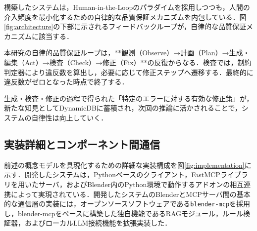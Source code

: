 \documentclass[dvipdfmx, a4paper, 9pt]{deimj}
\begin{document}
構築したシステムは，Human-in-the-Loopのパラダイムを採用しつつも，人間の介入頻度を最小化するための自律的な品質保証メカニズムを内包している．図\ref{fig:architecture}の下部に示されるフィードバックループが，自律的な品質保証メカニズムに該当する．

本研究の自律的品質保証ループは，**観測（Observe）→計画（Plan）→生成・編集（Act）→検査（Check）→修正（Fix）**の反復からなる．検査では，制約判定器により違反数を算出し，必要に応じて修正ステップへ遷移する．最終的に違反数がゼロとなった時点で終了する．

生成・検査・修正の過程で得られた「特定のエラーに対する有効な修正策」が，新たな知見としてDynamicDBに蓄積され，次回の推論に活かされることで，システムの自律性は向上していく．

\subsection{実装詳細とコンポーネント間通信}

前述の概念モデルを具現化するための詳細な実装構成を図\ref{fig:implementation}に示す．開発したシステムは，Pythonベースのクライアント，FastMCPライブラリを用いたサーバ，およびBlender内のPython環境で動作するアドオンの相互連携によって実現されている．開発したシステムのBlenderとMCPサーバ間の基本的な通信層の実装には，オープンソースソフトウェアである\texttt{blender-mcp}\cite{ahuja2025blendermcp}を採用し，blender-mcpをベースに構築した独自機能であるRAGモジュール，ルール検証器，およびローカルLLM接続機能を拡張実装した．
\end{document}
